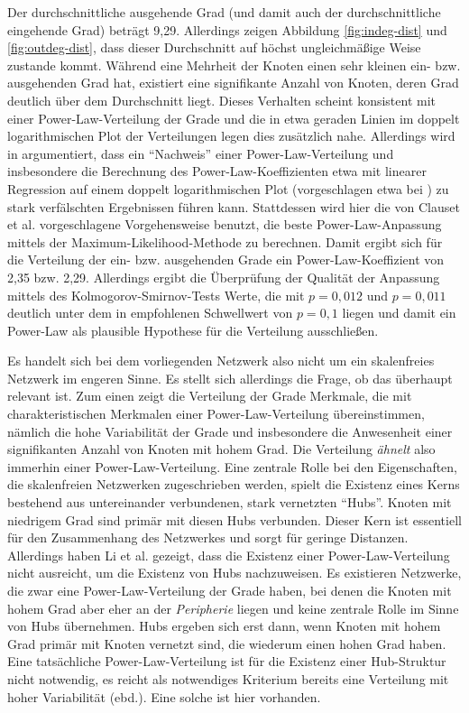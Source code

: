 Der durchschnittliche ausgehende Grad (und damit auch der
durchschnittliche eingehende Grad) beträgt 9,29. Allerdings zeigen
Abbildung \ref{fig:indeg-dist} und \ref{fig:outdeg-dist}, dass dieser
Durchschnitt auf höchst ungleichmäßige Weise zustande kommt. Während
eine Mehrheit der Knoten einen sehr kleinen ein- bzw. ausgehenden Grad
hat, existiert eine signifikante Anzahl von Knoten, deren Grad
deutlich über dem Durchschnitt liegt. Dieses Verhalten scheint konsistent
mit einer Power-Law-Verteilung der Grade und die in etwa geraden
Linien im doppelt logarithmischen Plot der Verteilungen legen dies
zusätzlich nahe. Allerdings wird in \cite{Clauset2009} argumentiert,
dass ein "`Nachweis"' einer Power-Law-Verteilung und insbesondere die
Berechnung des Power-Law-Koeffizienten etwa mit linearer Regression
auf einem doppelt logarithmischen Plot (vorgeschlagen etwa bei
\cite{Brinkmeier2004}) zu stark verfälschten Ergebnissen führen
kann. Stattdessen wird hier die von Clauset et al. vorgeschlagene
Vorgehensweise benutzt, die beste Power-Law-Anpassung mittels der
Maximum-Likelihood-Methode zu berechnen. Damit ergibt sich für die
Verteilung der ein- bzw. ausgehenden Grade ein Power-Law-Koeffizient
von 2,35 bzw. 2,29. Allerdings ergibt die Überprüfung der Qualität der
Anpassung mittels des Kolmogorov-Smirnov-Tests Werte, die mit $p =
0,012$ und $p = 0,011$ deutlich unter dem in \cite{Clauset2009}
empfohlenen Schwellwert von $p=0,1$ liegen und damit ein Power-Law als
plausible Hypothese für die Verteilung ausschließen.


Es handelt sich bei dem vorliegenden Netzwerk also nicht um ein
skalenfreies Netzwerk im engeren Sinne. Es stellt sich allerdings die
Frage, ob das überhaupt relevant ist. Zum einen zeigt die Verteilung
der Grade Merkmale, die mit charakteristischen Merkmalen einer
Power-Law-Verteilung übereinstimmen, nämlich die hohe
Variabilität der Grade und insbesondere die Anwesenheit einer
signifikanten Anzahl von Knoten mit hohem Grad. Die Verteilung
\emph{ähnelt} also immerhin einer Power-Law-Verteilung. Eine
zentrale Rolle bei den Eigenschaften, die skalenfreien Netzwerken
zugeschrieben werden, spielt die Existenz eines Kerns bestehend aus
untereinander verbundenen, stark vernetzten "`Hubs"'. Knoten mit niedrigem Grad sind primär mit diesen Hubs
verbunden. Dieser Kern ist essentiell  f\"ur den Zusammenhang des
Netzwerkes und sorgt für
geringe Distanzen. Allerdings haben Li et al. \cite{Li2005} gezeigt,
dass die Existenz einer Power-Law-Verteilung nicht ausreicht, um die
Existenz von Hubs nachzuweisen. Es existieren Netzwerke, die zwar eine
Power-Law-Verteilung der Grade haben, bei denen die Knoten mit hohem
Grad aber eher an der \emph{Peripherie} liegen und keine zentrale
Rolle im Sinne von Hubs übernehmen.  Hubs ergeben sich erst dann,
wenn Knoten mit hohem Grad primär mit Knoten vernetzt sind, die
wiederum einen hohen Grad haben. Eine tatsächliche
Power-Law-Verteilung ist für die Existenz einer Hub-Struktur nicht
notwendig, es reicht als notwendiges Kriterium bereits eine Verteilung
mit hoher Variabilität (ebd.). Eine solche ist hier vorhanden.

